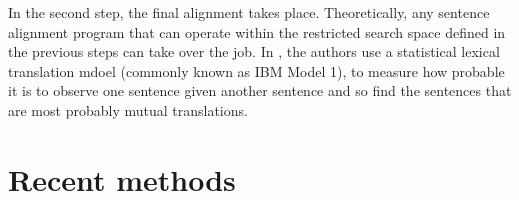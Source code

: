 In the second step, the final alignment takes place. 
Theoretically, any sentence alignment program that can operate within the restricted search space defined in the previous steps can take over the job. 
In \cite{simard-plamondon-1996-bilingual}, the authors use a statistical lexical translation mdoel (commonly known as IBM Model 1), to measure how probable it is to observe one sentence given another sentence and so find the sentences that are most probably mutual translations.


\section{Recent methods}